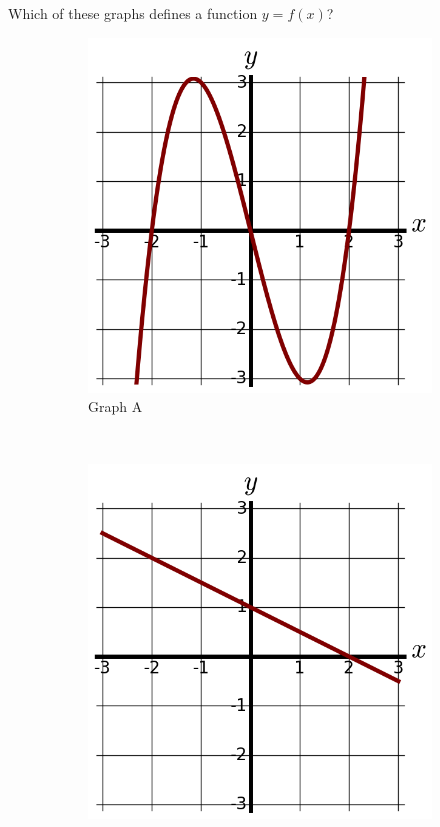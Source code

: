 \begin{example}
\label{ex:1-2-graphs}
Which of these graphs defines a function $y=f(x)$?
\begin{figure}[!ht]
    \centering
    \begin{subfigure}[b]{0.3\textwidth}
        \includegraphics[width=\textwidth]{img/chap1/sec1-2/ex114a.png}
        \caption{Graph A}
    \end{subfigure}
    ~
    \begin{subfigure}[b]{0.3\textwidth}
        \includegraphics[width=\textwidth]{img/chap1/sec1-2/ex114b.png}

\end{subfigure}
\end{figure}
\end{example}
